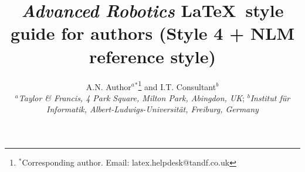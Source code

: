 \documentclass{tADR2e}
\begin{document}
   


\title{{\itshape Advanced Robotics} \LaTeX\ style guide for authors \break (Style 4 + NLM reference style)}

\author{A.N. Author$^{a}$$^{\ast}$\thanks{$^\ast$Corresponding author. Email: latex.helpdesk@tandf.co.uk
\vspace{6pt}} and I.T. Consultant$^{b}$\\\vspace{6pt}  $^{a}${\em{Taylor \& Francis, 4 Park Square, Milton Park, Abingdon, UK}};
$^{b}${\em{Institut f\"{u}r Informatik, Albert-Ludwigs-Universit\"{a}t, Freiburg,
Germany}}\\\vspace{6pt} }

\maketitle
\end{document}
